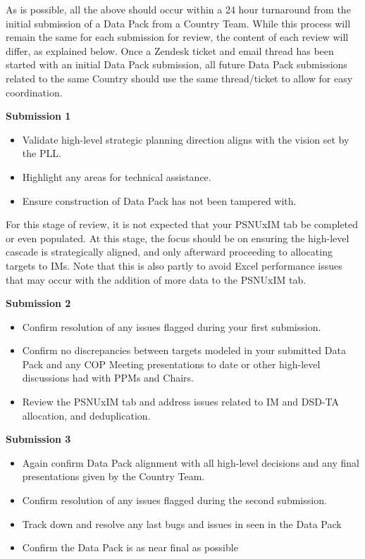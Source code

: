 \documentclass[
  openany]{book}
\begin{document}
As is possible, all the above should occur within a 24 hour turnaround
from the initial submission of a Data Pack from a Country Team.
While this process will remain the same for each submission for review,
the content of each review will differ, as explained below.
Once a Zendesk ticket and email thread has been started with an initial
Data Pack submission, all future Data Pack submissions related to the same
Country should use the same thread/ticket to allow for easy coordination.

\textbf{Submission 1}

\begin{itemize}
\item
  Validate high-level strategic planning direction aligns with the
  vision set by the PLL.
\item
  Highlight any areas for technical assistance.
\item
  Ensure construction of Data Pack has not been tampered with.
\end{itemize}

For this stage of review, it is not expected that your PSNUxIM tab be
completed or even populated. At this stage, the focus should be on
ensuring the high-level cascade is strategically aligned, and only
afterward proceeding to allocating targets to IMs. Note that this is
also partly to avoid Excel performance issues that may occur with the
addition of more data to the PSNUxIM tab.

\textbf{Submission 2}

\begin{itemize}
\item
  Confirm resolution of any issues flagged during your first submission.
\item
  Confirm no discrepancies between targets modeled in your submitted
  Data Pack and any COP Meeting presentations to date or other high-level
  discussions had with PPMs and Chairs.
\item
  Review the PSNUxIM tab and address issues related to IM and DSD-TA
  allocation, and deduplication.
\end{itemize}

\textbf{Submission 3}

\begin{itemize}
\item
  Again confirm Data Pack alignment with all high-level decisions and
  any final presentations given by the Country Team.
\item
  Confirm resolution of any issues flagged during the second submission.
\item
  Track down and resolve any last bugs and issues in seen in the Data Pack
\item
  Confirm the Data Pack is as near final as possible
\end{itemize}
\end{document}
